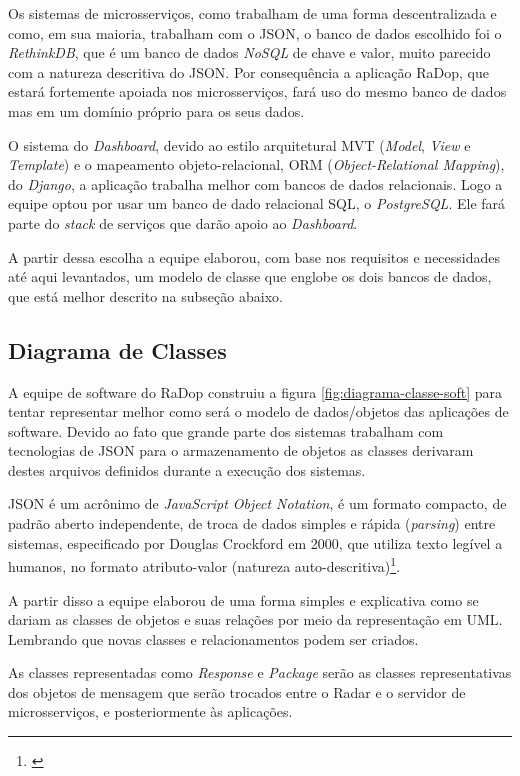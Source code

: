 Os sistemas de microsserviços, como trabalham de uma forma descentralizada e como, em sua maioria, trabalham com o JSON, o banco de dados escolhido foi o \textit{RethinkDB}, que é um banco de dados \textit{NoSQL} de chave e valor, muito parecido com a natureza descritiva do JSON. Por consequência a aplicação RaDop, que estará fortemente apoiada nos microsserviços, fará uso do mesmo banco de dados mas em um domínio próprio para os seus dados.

O sistema do \textit{Dashboard}, devido ao estilo arquitetural MVT (\textit{Model}, \textit{View} e \textit{Template}) e o mapeamento objeto-relacional, ORM (\textit{Object-Relational Mapping}), do \textit{Django}, a aplicação trabalha melhor com bancos de dados relacionais. Logo a equipe optou por usar um banco de dado relacional SQL, o \textit{PostgreSQL}. Ele fará parte do \textit{stack} de serviços que darão apoio ao \textit{Dashboard}.

A partir dessa escolha a equipe elaborou, com base nos requisitos e necessidades até aqui levantados, um modelo de classe que englobe os dois bancos de dados, que está melhor descrito na subseção abaixo.

\subsection{Diagrama de Classes}

A equipe de software do RaDop construiu a figura \ref{fig:diagrama-classe-soft} para tentar representar melhor como será o modelo de dados/objetos das aplicações de software. Devido ao fato que grande parte dos sistemas trabalham com tecnologias de JSON para o armazenamento de objetos as classes derivaram destes arquivos definidos durante a execução dos sistemas.

JSON é um acrônimo de \textit{JavaScript Object Notation}, é um formato compacto, de padrão aberto independente, de troca de dados simples e rápida (\textit{parsing}) entre sistemas, especificado por Douglas Crockford em 2000, que utiliza texto legível a humanos, no formato atributo-valor (natureza auto-descritiva)\footnote{\cite{jsonorg}}.

A partir disso a equipe elaborou de uma forma simples e explicativa como se dariam as classes de objetos e suas relações por meio da representação em UML. Lembrando que novas classes e relacionamentos podem ser criados.

As classes representadas como \textit{Response} e \textit{Package} serão as classes representativas dos objetos de mensagem que serão trocados entre o Radar e o servidor de microsserviços, e posteriormente às aplicações.

